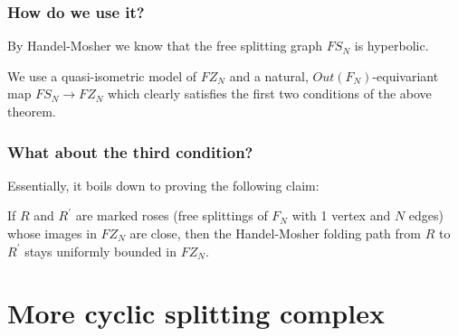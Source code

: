 \documentclass{beamer}
\theoremstyle{theorem}
\theoremstyle{definition}
\renewcommand{\-}{\ensuremath{^{-1}}}
\renewcommand{\>}{\ensuremath{\rightarrow}}
\newcommand{\pr}{^{\prime}}
\renewcommand{\(}{\langle}
\renewcommand{\)}{\rangle}
\begin{document}
\begin{frame}
\frametitle{How do we use it?}
By Handel-Mosher \cite{HandelMosher} we know that the free splitting graph $FS_N$ is hyperbolic.
\pause 
\vspace{1cm}

We use a quasi-isometric model of $FZ_N$ and a natural, $Out(F_N)$-equivariant map $FS_N \> FZ_N$ which clearly satisfies the first two conditions of the above theorem.
\end{frame}

\begin{frame}
\frametitle{What about the third condition?}
Essentially, it boils down to proving the following claim: 
\pause
\vspace{1cm}

If $R$ and $R\pr$ are marked roses (free splittings of $F_N$ with 1 vertex and $N$ edges) whose images in $FZ_N$ are close, then the Handel-Mosher folding path from $R$ to $R\pr$ stays uniformly bounded in $FZ_N$. 
\end{frame}

\section{More cyclic splitting complex}
\end{document}
